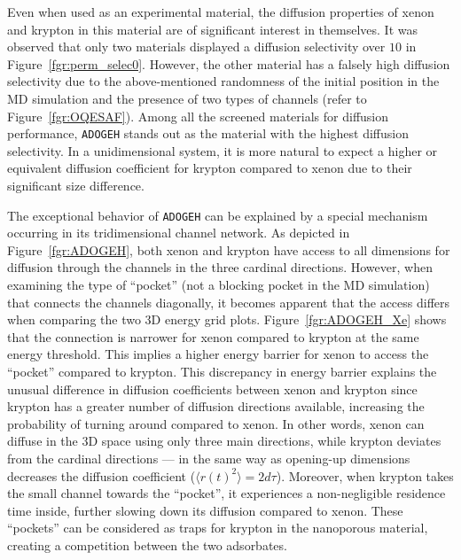 \documentclass[main]{subfiles}
\begin{document}
Even when used as an experimental material, the diffusion properties of xenon and krypton in this material are of significant interest in themselves. It was observed that only two materials displayed a diffusion selectivity over $10$ in Figure~\ref{fgr:perm_selec0}. However, the other material has a falsely high diffusion selectivity due to the above-mentioned randomness of the initial position in the MD simulation and the presence of two types of channels (refer to Figure~\ref{fgr:OQESAF}). Among all the screened materials for diffusion performance, \texttt{ADOGEH} stands out as the material with the highest diffusion selectivity. In a unidimensional system, it is more natural to expect a higher or equivalent diffusion coefficient for krypton compared to xenon due to their significant size difference.

The exceptional behavior of \texttt{ADOGEH} can be explained by a special mechanism occurring in its tridimensional channel network. As depicted in Figure~\ref{fgr:ADOGEH}, both xenon and krypton have access to all dimensions for diffusion through the channels in the three cardinal directions. However, when examining the type of ``pocket'' (not a blocking pocket in the MD simulation) that connects the channels diagonally, it becomes apparent that the access differs when comparing the two 3D energy grid plots. Figure~\ref{fgr:ADOGEH_Xe} shows that the connection is narrower for xenon compared to krypton at the same energy threshold. This implies a higher energy barrier for xenon to access the ``pocket'' compared to krypton. This discrepancy in energy barrier explains the unusual difference in diffusion coefficients between xenon and krypton since krypton has a greater number of diffusion directions available, increasing the probability of turning around compared to xenon. In other words, xenon can diffuse in the 3D space using only three main directions, while krypton deviates from the cardinal directions --- in the same way as opening-up dimensions decreases the diffusion coefficient ($\langle{r(t)}^2\rangle=2d\tau$). Moreover, when krypton takes the small channel towards the ``pocket'', it experiences a non-negligible residence time inside, further slowing down its diffusion compared to xenon. These ``pockets'' can be considered as traps for krypton in the nanoporous material, creating a competition between the two adsorbates. 
\end{document}
